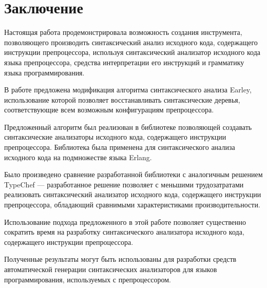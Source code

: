 \clearpage

\section{Заключение}

Настоящая работа продемонстрировала возможность создания инструмента, позволяющего производить синтаксический анализ исходного кода, содержащего инструкции препроцессора, используя синтаксический анализатор исходного кода языка препроцессора, средства интерпретации его инструкций и грамматику языка программирования.

В работе предложена модификация алгоритма синтаксического анализа Earley, использование которой позволяет восстанавливать синтаксические деревья, соответствующие всем возможным конфигурациям препроцессора.

Предложенный алгоритм был реализован в библиотеке позволяющей создавать синтаксические анализаторы исходного кода, содержащего инструкции препроцессора. Библиотека была применена для синтаксического анализа исходного кода на подмножестве языка Erlang.

Было произведено сравнение разработанной библиотеки с аналогичным решением TypeChef --- разработанное решение позволяет с меньшими трудозатратами реализовать синтаксический анализатор исходного кода, содержащего инструкции препроцессора, обладающий сравнимыми характеристиками производительности.

Использование подхода предложенного в этой работе позволяет существенно сократить время на разработку синтаксического анализатора исходного кода, содержащего инструкции препроцессора.

Полученные результаты могут быть использованы для разработки средств автоматической генерации синтаксических анализаторов для языков программирования, используемых с препроцессором.
